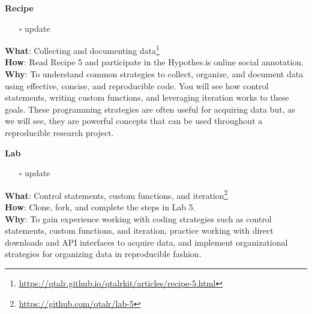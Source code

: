 \documentclass[
  letterpaper,
  DIV=11,
  numbers=noendperiod]{scrreport}
\providecommand{\tightlist}{%
  \setlength{\itemsep}{0pt}\setlength{\parskip}{0pt}}\usepackage{longtable,booktabs,array}
\theoremstyle{definition}
\theoremstyle{remark}
\DeclareRobustCommand{\href}[2]{#2\footnote{\url{#1}}}
\begin{document}
\begin{tcolorbox}[enhanced jigsaw, leftrule=.75mm, bottomrule=.15mm, opacityback=0, breakable, left=2mm, colback=white, toprule=.15mm, arc=.35mm, rightrule=.15mm]

\textbf{ Recipe}

\begin{itemize}
\tightlist
\item[$\square$]
   update
\end{itemize}

\textbf{What}:
\href{https://qtalr.github.io/qtalrkit/articles/recipe-5.html}{Collecting
and documenting data}\\
\textbf{How}: Read Recipe 5 and participate in the Hypothes.is online
social annotation.\\
\textbf{Why}: To understand common strategies to collect, organize, and
document data using effective, concise, and reproducible code. You will
see how control statements, writing custom functions, and leveraging
iteration works to these goals. These programming strategies are often
useful for acquiring data but, as we will see, they are powerful
concepts that can be used throughout a reproducible research project.

\end{tcolorbox}

\begin{tcolorbox}[enhanced jigsaw, leftrule=.75mm, bottomrule=.15mm, opacityback=0, breakable, left=2mm, colback=white, toprule=.15mm, arc=.35mm, rightrule=.15mm]

\textbf{ Lab}

\begin{itemize}
\tightlist
\item[$\square$]
   update
\end{itemize}

\textbf{What}: \href{https://github.com/qtalr/lab-5}{Control statements,
custom functions, and iteration}\\
\textbf{How}: Clone, fork, and complete the steps in Lab 5.\\
\textbf{Why}: To gain experience working with coding strategies such as
control statements, custom functions, and iteration, practice working
with direct downloads and API interfaces to acquire data, and implement
organizational strategies for organizing data in reproducible fashion.

\end{tcolorbox}
\end{document}

